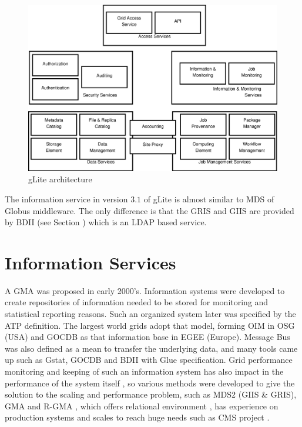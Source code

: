 \begin{figure}[htb]
\centering
 \includegraphics[width=130mm]{images/glite.eps}
\caption{gLite architecture}
\label{figure:glite}
\end{figure}

The information service in version $3.1$ of gLite is almost similar to \ac{MDS} of Globus middleware. The only difference is that the \ac{GRIS} and \ac{GIIS} are provided by \ac{BDII} (see Section ) which is an LDAP based service.

\section{Information Services}
A \ac{GMA} \cite{tierney2002grid} was proposed in early 2000's. Information systems were developed to create repositories of information needed to be stored for monitoring and statistical reporting reasons. Such an organized system later was specified by the \ac{ATP} definition. The largest world grids adopt that model, forming \ac{OIM} in \ac{OSG} (USA) and \ac{GOCDB} as that information base in \ac{EGEE} (Europe). Message Bus was also defined as a mean to transfer the underlying data, and many tools came up such as Gstat, \ac{GOCDB} and \ac{BDII} with Glue specification. Grid performance monitoring and keeping of such an information system has also impact in the performance of the system itself \cite{zhang2003performance}, so various methods were developed to give the solution to the scaling and performance problem, such as \ac{MDS}2 (\ac{GIIS} \& \ac{GRIS}), \ac{GMA} and \ac{R-GMA} \cite{wilson2004information}, which offers relational environment \cite{fisher2001relational}, has experience on production systems \cite{byrom-production} and scales to reach huge needs such as \ac{CMS} project \cite{Bonacorsi2004,Byrom}.

